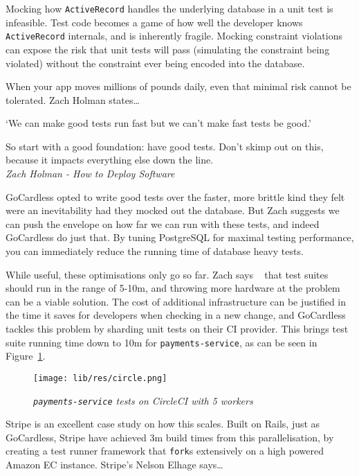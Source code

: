 \documentclass[11pt]{article}
\begin{document}
Mocking how \texttt{ActiveRecord} handles the underlying database in a unit test
is infeasible. Test code becomes a game of how well the developer knows
\texttt{ActiveRecord} internals, and is inherently fragile. Mocking constraint
violations can expose the risk that unit tests will pass (simulating the
constraint being violated) without the constraint ever being encoded into the
database.

When your app moves millions of pounds daily, even that minimal risk cannot be
tolerated. Zach Holman states\dots

\begin{displayquote}

  `We can make good tests run fast but we can't make fast tests be good.'

  So start with a good foundation: have good tests. Don't skimp out on this,
  because it impacts everything else down the line. \\

  \textit{Zach Holman - How to Deploy Software~\cite{howToDeploySoftware}}

\end{displayquote}

GoCardless opted to write good tests over the faster, more brittle kind they
felt were an inevitability had they mocked out the database. But Zach suggests
we can push the envelope on how far we can run with these tests, and indeed
GoCardless do just that. By tuning PostgreSQL for maximal testing performance,
you can immediately reduce the running time of database heavy tests.

While useful, these optimisations only go so far. Zach says
~\cite{howToDeploySoftware} that test suites should run in the range of 5-10m,
and throwing more hardware at the problem can be a viable solution. The cost of
additional infrastructure can be justified in the time it saves for developers
when checking in a new change, and GoCardless tackles this problem by sharding
unit tests on their CI provider. This brings test suite running time down to 10m
for \texttt{payments-service}, as can be seen in Figure~\ref{fig:circle}.

\begin{figure}
\centering
\texttt{[image: lib/res/circle.png]}
\caption{\label{fig:circle}\textit{\texttt{payments-service} tests on CircleCI
with 5 workers}}
\end{figure}

Stripe is an excellent case study on how this scales. Built on Rails, just as
GoCardless, Stripe have achieved 3m build times from this parallelisation, by
creating a test runner framework that \texttt{fork}s extensively on a high
powered Amazon EC instance. Stripe's Nelson Elhage says\dots
\end{document}
